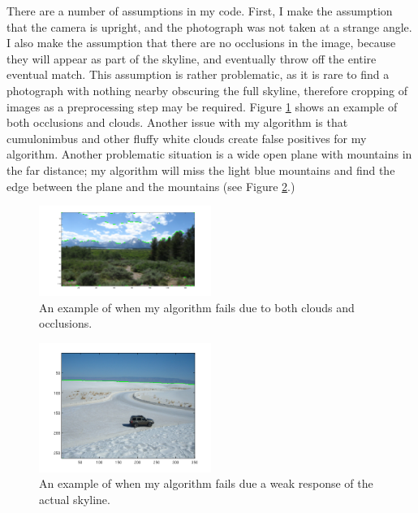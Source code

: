 \documentclass{acm_proc_article-sp}
\begin{document}
    There are a number of assumptions in my code.  First, I make the assumption that the camera is upright, and the photograph was not taken at a strange angle.  I also make the assumption that there are no occlusions in the image, because they will appear as part of the skyline, and eventually throw off the entire eventual match.  This assumption is rather problematic, as it is rare to find a photograph with nothing nearby obscuring the full skyline, therefore cropping of images as a preprocessing step may be required. Figure \ref{fig:tetFail} shows an example of both occlusions and clouds. Another issue with my algorithm is that cumulonimbus and other fluffy white clouds create false positives for my algorithm.   Another problematic situation is a wide open plane with mountains in the far distance; my algorithm will miss the light blue mountains and find the edge between the plane and the mountains (see Figure \ref{fig:whiteSandsFail}.)  
\begin{figure}
	\centering
	\includegraphics[width=0.5\textwidth]{tetonsCloudErrorSmallSkyline.png}
	\caption{An example of when my algorithm fails due to both clouds and occlusions.}
	\label{fig:tetFail}
\end{figure}
\begin{figure}
\centering
	\includegraphics[width=0.5\textwidth]{whiteSandsAnnotated.png}
	\caption{An example of when my algorithm fails due a weak response of the actual skyline.}
	\label{fig:whiteSandsFail}
\end{figure}
\end{document}
